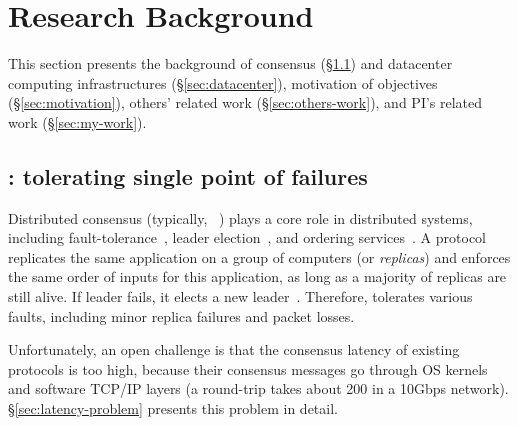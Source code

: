 \vspace{-.15in}\section{Research Background} 
\label{sec:background}\vspace{-.075in}

This section presents the background of consensus (\S\ref{sec:consensus}) and 
datacenter computing infrastructures (\S\ref{sec:datacenter}), motivation of 
objectives (\S\ref{sec:motivation}), others' related work 
(\S\ref{sec:others-work}), and PI's related work (\S\ref{sec:my-work}).

\vspace{-.15in}\subsection{\paxos: tolerating single point of failures} 
\label{sec:consensus}\vspace{-.075in}

Distributed consensus (typically, 
\paxos~\cite{paxos,paxos:practical,paxos,paxos:simple,paxos:complex}) plays a 
core role in distributed systems, 
including fault-tolerance~\cite{eve:osdi12,rex:eurosys14,crane:sosp15},
leader election~\cite{zookeeper, chubby:osdi}, and ordering 
services~\cite{ellis:thesis,manos:hotdep10,scatter:sosp11}. A \paxos protocol
replicates the same application on a group of computers (or \emph{replicas}) 
and enforces the same order of inputs for this application, as long as 
a majority of replicas are still alive. If leader fails, it elects a new 
leader~\cite{paxos:practical}. Therefore, \paxos tolerates 
various faults, including minor replica failures and packet losses. 


Unfortunately, an open challenge is that the consensus latency of existing 
\paxos protocols is too high, because their consensus messages go through OS 
kernels and software TCP/IP layers (a  round-trip takes about 200 \us 
in a 10Gbps network). \S\ref{sec:latency-problem} presents this problem in 
detail.


